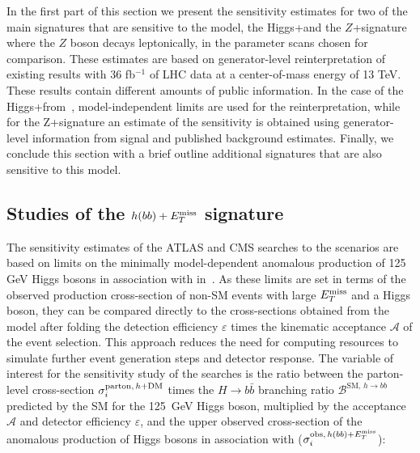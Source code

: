 In the first part of this section we present the sensitivity estimates for two of the main signatures that are sensitive to the model, the Higgs+\MET and the $Z$+\MET signature where the $Z$ boson decays leptonically, in the parameter scans chosen for comparison. These estimates are based on generator-level reinterpretation of existing results with  36 fb$^{-1}$ of LHC data at a center-of-mass energy of 13 TeV. These results contain different amounts of public information. In the case of the Higgs+\MET from~\cite{Aaboud:2017yqz}, model-independent limits are used for the reinterpretation, while for the Z+\MET signature an estimate of the sensitivity is obtained using generator-level information from signal and published background estimates. Finally, we conclude this section with a brief outline additional signatures that are also sensitive to this model. 



\subsection{Studies of the $h(bb)+E_T^\mathrm{miss}$ signature}
\label{sec:sensi_monohbb}
%

The sensitivity estimates of the ATLAS and CMS \monohbb searches to the \hdma scenarios are based on limits on the minimally model-dependent anomalous production of 125 GeV Higgs bosons in association with \met in~\cite{Aaboud:2017yqz}. 
As these limits are set in terms of the observed production cross-section of non-SM events with large $E_T^\mathrm{miss}$ and a Higgs boson, they can be compared directly to the cross-sections obtained from the \hdma model after folding the detection efficiency $\varepsilon$ times the kinematic acceptance $\mathcal{A}$ of the event selection. This approach reduces the need for computing resources to simulate further event generation steps and detector response. 
The variable of interest for the sensitivity study of the \monohbb searches is the ratio between the parton-level cross-section $\sigma_{i}^{\mathrm{parton},\,h+\textrm{DM}}$ times the $H\rightarrow b\bar{b}$ branching ratio $\mathcal{B}^{\mathrm{SM},\,h\to bb}$ predicted by the SM for the 125~GeV Higgs boson, multiplied by the acceptance $\mathcal{A}$ and detector efficiency $\varepsilon$, and the upper observed cross-section of the anomalous production of Higgs bosons in association with \met ($\sigma_{i}^{\mathrm{obs},\,h(bb)+E_T^\mathrm{miss}}$):

